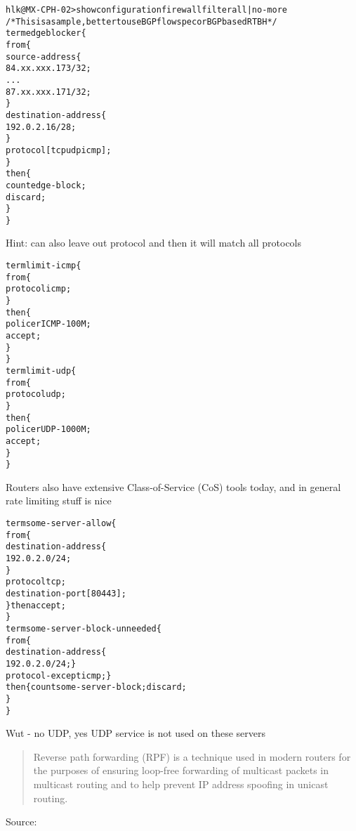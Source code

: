 \documentclass[Screen16to9,17pt]{foils}
\begin{document}

\begin{alltt}\footnotesize
hlk@MX-CPH-02> show configuration firewall filter all | no-more
/* This is a sample, better to use BGP flowspec or BGP based RTBH */
term edgeblocker \{
    from \{
        source-address \{
            84.xx.xxx.173/32;
...
            87.xx.xxx.171/32;
        \}
        destination-address \{
            192.0.2.16/28;
        \}
        protocol [ tcp udp icmp ];
    \}
    then \{
        count edge-block;
        discard;
    \}
\}
\end{alltt}
Hint: can also leave out protocol and then it will match all protocols


\begin{alltt}\footnotesize
term limit-icmp \{
    from \{
        protocol icmp;
    \}
    then \{
        policer ICMP-100M;
        accept;
    \}
\}
term limit-udp \{
    from \{
        protocol udp;
    \}
    then \{
        policer UDP-1000M;
        accept;
    \}
\}
\end{alltt}

Routers also have extensive Class-of-Service (CoS) tools today, and in general rate limiting stuff is nice


\begin{alltt}\footnotesize
term some-server-allow \{
    from \{
        destination-address \{
            192.0.2.0/24;
        \}
        protocol tcp;
        destination-port [ 80 443 ];
    \} then accept;
\}
term some-server-block-unneeded \{
    from \{
        destination-address \{
            192.0.2.0/24; \}
        protocol-except icmp;  \}
    then \{ count some-server-block; discard;
    \}
\}
\end{alltt}

Wut - no UDP, yes UDP service is not used on these servers



\begin{quote}
Reverse path forwarding (RPF) is a technique used in modern routers for the purposes of ensuring loop-free forwarding of multicast packets in multicast routing and to help prevent IP address spoofing in unicast routing.
\end{quote}
Source: 
\end{document}
